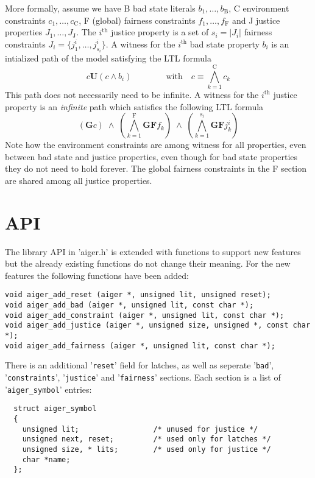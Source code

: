 \documentclass{llncs}
\begin{document}
More formally, assume we have B bad state literals $b_1, \ldots,
b_{\mathrm{B}}$, C environment constraints $c_1, \ldots, c_{\mathrm{C}}$,
F (global) fairness constraints $f_1, \ldots, f_{\mathrm{F}}$ and J
justice properties $J_1,\ldots,J_{\mathrm{J}}$.   The
$i^{\mathrm{th}}$ justice property is a set of $s_i = |J_i|$ fairness
constraints $J_i = \{j^i_1,\ldots,j^i_{s_i}\}$.  A witness for the
$i^{\mathrm{th}}$ bad state property $b_i$ is an intialized path of the
model satisfying the LTL formula
\[
{c} \mathrel{\mathbf{U}} (c \wedge b_i)
\qquad
\qquad
\mbox{with}
\quad
 c \equiv \bigwedge_{k=1}^{\mathrm{C}} c_k
\]
This path does not necessarily need to be infinite.  A witness for the
$i^{\mathrm{th}}$ justice property is an \emph{infinite} path which satisfies
the following LTL formula
\[
(\mathrel{\mathbf{G}} c)
\;\wedge\;
(\bigwedge_{k=1}^{\mathrm{F}} {\mathrel{\mathbf{G}} \mathrel{\mathbf{F}} f_k})
\;\wedge\;
(\bigwedge_{k=1}^{\mathrm{s_i}} {\mathrel{\mathbf{G}} \mathrel{\mathbf{F}} j_k^i})
\]
Note how the environment constraints are among witness for all properties,
even between bad state and justice properties, even though for bad state
properties they do not need to hold forever.  The global fairness
constraints in the F section are shared among all justice properties.

\section{API}

The library API in 'aiger.h' is extended with functions to support new
features but the already existing functions do not change their meaning.
For the new features the following functions have been added:
{\small
\begin{verbatim}
void aiger_add_reset (aiger *, unsigned lit, unsigned reset);
void aiger_add_bad (aiger *, unsigned lit, const char *);
void aiger_add_constraint (aiger *, unsigned lit, const char *);
void aiger_add_justice (aiger *, unsigned size, unsigned *, const char *);
void aiger_add_fairness (aiger *, unsigned lit, const char *);
\end{verbatim}}

There is an additional '\texttt{reset}' field for latches, as well as 
seperate '\texttt{bad}', '\texttt{constraints}', '\texttt{justice}' and
'\texttt{fairness}' sections.  Each section
is a list of '\texttt{aiger\_symbol}' entries:

{\small
\begin{verbatim}
  struct aiger_symbol
  {
    unsigned lit;                 /* unused for justice */
    unsigned next, reset;         /* used only for latches */
    unsigned size, * lits;        /* used only for justice */
    char *name;
  };
\end{verbatim}}
\end{document}
